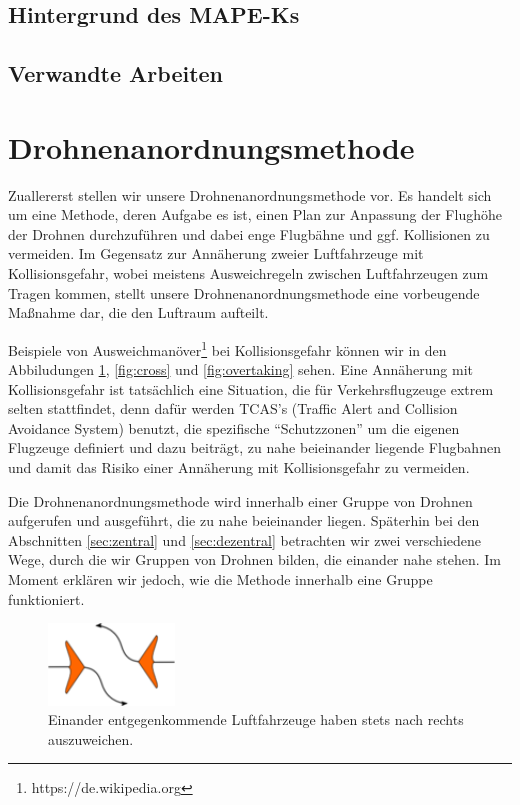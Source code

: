 \documentclass[a4paper,titlepage,onecolumn,twoside,12pt]{article}
\begin{document}
\subsection{Hintergrund des MAPE-Ks}
\label{subsec:hintergrund}
\subsection{Verwandte Arbeiten} %
\label{subsec:verwandte}

\section{Drohnenanordnungsmethode}
\label{sec:drohnenanordnungs}
Zuallererst stellen wir unsere Drohnenanordnungsmethode vor. Es handelt sich um eine Methode, deren Aufgabe es ist, einen Plan zur Anpassung der Flughöhe 
der Drohnen durchzuführen und dabei enge Flugbähne und ggf. Kollisionen zu vermeiden. Im Gegensatz zur Annäherung zweier Luftfahrzeuge mit 
Kollisionsgefahr, wobei meistens Ausweichregeln zwischen Luftfahrzeugen zum Tragen kommen, stellt unsere Drohnenanordnungsmethode eine vorbeugende Maßnahme   
dar, die den Luftraum aufteilt. 

Beispiele von Ausweichmanöver\footnote{https://de.wikipedia.org} bei Kollisionsgefahr können wir in den Abbiludungen 
\ref{fig:encounter}, \ref{fig:cross} und \ref{fig:overtaking} sehen. Eine Annäherung mit Kollisionsgefahr ist tatsächlich eine Situation, die für 
Verkehrsflugzeuge extrem selten stattfindet, denn dafür werden TCAS's (Traffic Alert and Collision Avoidance System) benutzt, die spezifische
"`Schutzzonen"' um die eigenen Flugzeuge definiert und dazu beiträgt, zu nahe beieinander liegende Flugbahnen und damit das Risiko einer Annäherung mit 
Kollisionsgefahr zu vermeiden.

Die Drohnenanordnungsmethode wird innerhalb einer Gruppe von Drohnen aufgerufen und ausgeführt, die zu nahe beieinander liegen. Späterhin bei den 	
Abschnitten \ref{sec:zentral} und \ref{sec:dezentral} betrachten wir zwei verschiedene Wege, durch die wir Gruppen von Drohnen bilden, die einander nahe 
stehen. Im Moment erklären wir jedoch, wie die Methode innerhalb eine Gruppe funktioniert.


\begin{figure}
\centering
\includegraphics[width=0.3\textwidth]{120px-Encounter_rule}
\caption{Einander entgegenkommende Luftfahrzeuge haben stets nach rechts auszuweichen.}
\label{fig:encounter}
\end{figure}
\end{document}
